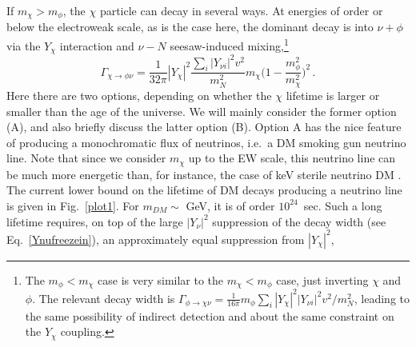 \documentclass[prd,a4paper,twocolumn,preprintnumbers,nofootinbib,superscriptaddress]{revtex4}
\begin{document}
	
If $m_\chi>m_\phi$, the $\chi$ particle can decay in several ways. At energies of order or below the electroweak scale, as is the case here, the dominant decay is into $\nu+\phi$ via the $Y_\chi$ interaction and $\nu-N$ seesaw-induced mixing,\footnote{The $m_\phi<m_\chi$ case is very similar to the $m_\chi<m_\phi$ case, just inverting $\chi$ and $\phi$.  The relevant decay width is $\Gamma_{\phi\rightarrow \chi\nu}=\frac{1}{16 \pi} m_\phi \sum_i |Y_\chi|^2 |Y_{\nu i}|^2 v^2/m^2_{N}$,
leading to the same possibility of indirect detection
and about the same constraint on the $Y_\chi$ coupling.}
\begin{equation}
	\Gamma_{\chi\rightarrow \phi\nu}=\frac{1}{32\pi} |Y_\chi|^2 \frac{ \sum_i|Y_{\nu i}|^2 v^2}{m^2_{N}}m_{\chi}\Big(1-\frac{m_\phi^2}{m_\chi^2}\Big)^2 \, .
		\label{GammaChi}
\end{equation}
Here there are two options, depending on whether the %
$\chi$ lifetime is larger or smaller than the age of the universe.
We will mainly consider the former option (A), and also briefly discuss the latter option (B).
Option A has the nice feature of producing a monochromatic flux of neutrinos, i.e.~a DM smoking gun neutrino line. 
Note that since we consider $m_\chi$ up to the EW scale, this neutrino line can be much more energetic than, for instance, the case of keV sterile neutrino DM \cite{Dodelson:1993je,Shi:1998km,Boyarsky:2018tvu,Lucente:2021har}. 
The current lower bound on the lifetime of DM decays producing a neutrino line is given in Fig.~\ref{plot1}. For $m_{DM} \sim$ GeV, it is of order $10^{24}$~sec. Such a long lifetime requires, on top of the large $|Y_\nu|^2$ suppression of the decay width (see Eq.~\eqref{Ynufreezein}), an approximately equal suppression from $|Y_\chi|^2$,
\end{document}
